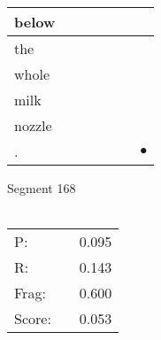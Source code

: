 \documentclass[landscape]{article}
\newcommand{\ssp}{\hspace{2pt}}
\newcommand{\mex}{\cellcolor{g}$\bullet$}
\begin{document}
\begin{tabular}{|l|p{10pt}|p{10pt}|p{10pt}|p{10pt}|p{10pt}|p{10pt}|}
\hline
\ssp below \ssp&\hspace{2pt}&\hspace{2pt}&\hspace{2pt}&\hspace{2pt}&\hspace{2pt}&\hspace{2pt}\\
\hline
\ssp the \ssp&\hspace{2pt}&\hspace{2pt}&\hspace{2pt}&\hspace{2pt}&\hspace{2pt}&\hspace{2pt}\\
\hline
\ssp whole \ssp&\hspace{2pt}&\hspace{2pt}&\hspace{2pt}&\hspace{2pt}&\hspace{2pt}&\hspace{2pt}\\
\hline
\ssp milk \ssp&\hspace{2pt}&\hspace{2pt}&\hspace{2pt}&\hspace{2pt}&\hspace{2pt}&\hspace{2pt}\\
\hline
\ssp nozzle \ssp&\hspace{2pt}&\hspace{2pt}&\hspace{2pt}&\hspace{2pt}&\hspace{2pt}&\hspace{2pt}\\
\hline
\ssp \cellcolor{ref5}. \ssp&\hspace{2pt}&\hspace{2pt}&\hspace{2pt}&\hspace{2pt}&\hspace{2pt}&\hspace{2pt}\mex\\
\hline
\end{tabular}

\vspace{6pt}
\noindent Segment 168\\\\
\noindent\begin{tabular}{lm{12pt}r}
\hline
P:&&0.095\\
R:&&0.143\\
Frag:&&0.600\\
Score:&&0.053\\
\end{tabular}
\end{document}

